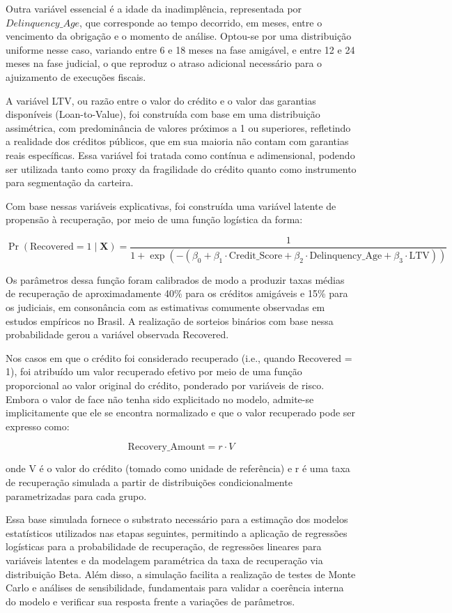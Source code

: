 \documentclass[a4paper,12pt]{article}
\begin{document}
Outra variável essencial é a idade da inadimplência, representada por $Delinquency\_Age$, que corresponde ao tempo decorrido, em meses, entre o vencimento da obrigação e o momento de análise. Optou-se por uma distribuição uniforme nesse caso, variando entre 6 e 18 meses na fase amigável, e entre 12 e 24 meses na fase judicial, o que reproduz o atraso adicional necessário para o ajuizamento de execuções fiscais.

A variável LTV, ou razão entre o valor do crédito e o valor das garantias disponíveis (Loan-to-Value), foi construída com base em uma distribuição assimétrica, com predominância de valores próximos a 1 ou superiores, refletindo a realidade dos créditos públicos, que em sua maioria não contam com garantias reais específicas. Essa variável foi tratada como contínua e adimensional, podendo ser utilizada tanto como proxy da fragilidade do crédito quanto como instrumento para segmentação da carteira.

Com base nessas variáveis explicativas, foi construída uma variável latente de propensão à recuperação, por meio de uma função logística da forma:

\[
\Pr(\text{Recovered} = 1 \mid \mathbf{X}) = \frac{1}{1 + \exp(-(\beta_0 + \beta_1 \cdot \text{Credit\_Score} + \beta_2 \cdot \text{Delinquency\_Age} + \beta_3 \cdot \text{LTV}))}
\]
 
Os parâmetros dessa função foram calibrados de modo a produzir taxas médias de recuperação de aproximadamente 40\% para os créditos amigáveis e 15\% para os judiciais, em consonância com as estimativas comumente observadas em estudos empíricos no Brasil. A realização de sorteios binários com base nessa probabilidade gerou a variável observada Recovered.

Nos casos em que o crédito foi considerado recuperado (i.e., quando Recovered = 1), foi atribuído um valor recuperado efetivo por meio de uma função proporcional ao valor original do crédito, ponderado por variáveis de risco. Embora o valor de face não tenha sido explicitado no modelo, admite-se implicitamente que ele se encontra normalizado e que o valor recuperado pode ser expresso como:

\[
\text{Recovery\_Amount} = r \cdot V
\]

onde V é o valor do crédito (tomado como unidade de referência) e r é uma taxa de recuperação simulada a partir de distribuições condicionalmente parametrizadas para cada grupo.

Essa base simulada fornece o substrato necessário para a estimação dos modelos estatísticos utilizados nas etapas seguintes, permitindo a aplicação de regressões logísticas para a probabilidade de recuperação, de regressões lineares para variáveis latentes e da modelagem paramétrica da taxa de recuperação via distribuição Beta. Além disso, a simulação facilita a realização de testes de Monte Carlo e análises de sensibilidade, fundamentais para validar a coerência interna do modelo e verificar sua resposta frente a variações de parâmetros.
\end{document}
